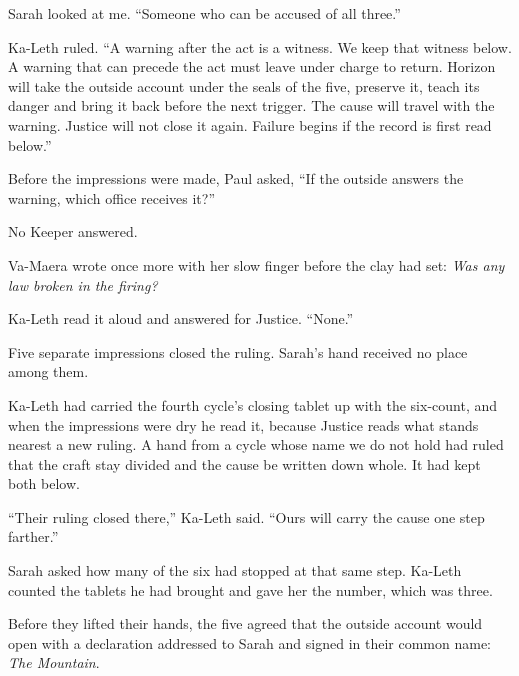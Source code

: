 Sarah looked at me. ``Someone who can be accused of all three.''\par

Ka-Leth ruled. ``A warning after the act is a witness. We keep that witness below. A warning that can precede the act must leave under charge to return. Horizon will take the outside account under the seals of the five, preserve it, teach its danger and bring it back before the next trigger. The cause will travel with the warning. Justice will not close it again. Failure begins if the record is first read below.''\par

Before the impressions were made, Paul asked, ``If the outside answers the warning, which office receives it?''\par

No Keeper answered.\par

Va-Maera wrote once more with her slow finger before the clay had set: \emph{Was any law broken in the firing?}\par

Ka-Leth read it aloud and answered for Justice. ``None.''\par

Five separate impressions closed the ruling. Sarah's hand received no place among them.\par

Ka-Leth had carried the fourth cycle's closing tablet up with the six-count, and when the impressions were dry he read it, because Justice reads what stands nearest a new ruling. A hand from a cycle whose name we do not hold had ruled that the craft stay divided and the cause be written down whole. It had kept both below.\par

``Their ruling closed there,'' Ka-Leth said. ``Ours will carry the cause one step farther.''\par

Sarah asked how many of the six had stopped at that same step. Ka-Leth counted the tablets he had brought and gave her the number, which was three.\par

Before they lifted their hands, the five agreed that the outside account would open with a declaration addressed to Sarah and signed in their common name: \emph{The Mountain}.\par

\ornament

